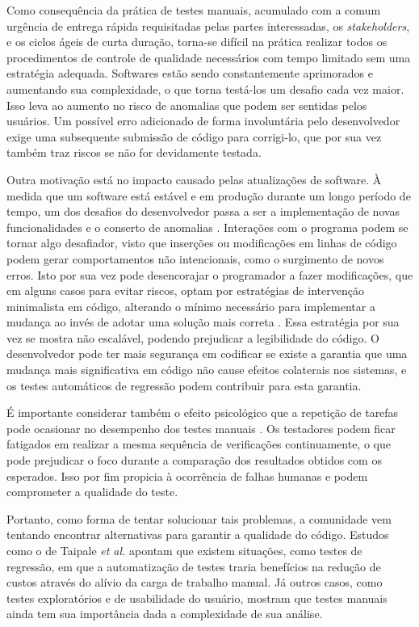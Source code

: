 Como consequência da prática de testes manuais, acumulado com a comum urgência de entrega rápida requisitadas pelas partes interessadas, os \emph{stakeholders}, e os ciclos ágeis de curta duração, torna-se difícil na prática realizar todos os procedimentos de controle de qualidade necessários com tempo limitado sem uma estratégia adequada. Softwares estão sendo constantemente aprimorados e aumentando sua complexidade, o que torna testá-los um desafio cada vez maior. Isso leva ao aumento no risco de anomalias que podem ser sentidas pelos usuários. Um possível erro adicionado de forma involuntária pelo desenvolvedor exige uma subsequente submissão de código para corrigi-lo, que por sua vez também traz riscos se não for devidamente testada.

Outra motivação está no impacto causado pelas atualizações de software. À medida que um software está estável e em produção durante um longo período de tempo, um dos desafios do desenvolvedor passa a ser a implementação de novas funcionalidades e o conserto de anomalias \cite{gupta}. Interações com o programa podem se tornar algo desafiador, visto que inserções ou modificações em linhas de código podem gerar comportamentos não intencionais, como o surgimento de novos erros. Isto por sua vez pode desencorajar o programador a fazer modificações, que em alguns casos para evitar riscos, optam por estratégias de intervenção minimalista em código, alterando o mínimo necessário para implementar a mudança ao invés de adotar uma solução mais correta \cite{mikkonen}. Essa estratégia por sua vez se mostra não escalável, podendo prejudicar a legibilidade do código. O desenvolvedor pode ter mais segurança em codificar se existe a garantia que uma mudança mais significativa em código não cause efeitos colaterais nos sistemas, e os testes automáticos de regressão podem contribuir para esta garantia.

É importante considerar também o efeito psicológico que a repetição de tarefas pode ocasionar no desempenho dos testes manuais \cite{desikan}. Os testadores podem ficar fatigados em realizar a mesma sequência de verificações continuamente, o que pode prejudicar o foco durante a comparação dos resultados obtidos com os esperados. Isso por fim propicia à ocorrência de falhas humanas e podem comprometer a qualidade do teste.

Portanto, como forma de tentar solucionar tais problemas, a comunidade vem tentando encontrar alternativas para garantir a qualidade do código. Estudos como o de Taipale \emph{et al.} \cite{taipale} apontam que existem situações, como testes de regressão, em que a automatização de testes traria benefícios na redução de custos através do alívio da carga de trabalho manual. Já outros casos, como testes exploratórios e de usabilidade do usuário, mostram que testes manuais ainda tem sua importância dada a complexidade de sua análise.

